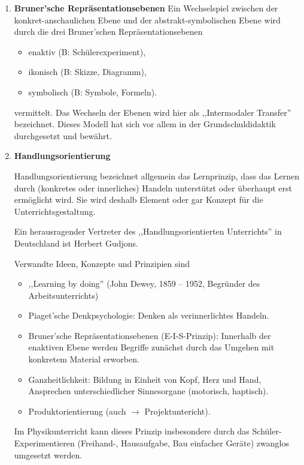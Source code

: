 \begin{enumerate}
\begin{itemize}
	\end{itemize}

	\item{\textbf{Bruner'sche Repr\"{a}sentationsebenen}}
		Ein Wechselspiel zwischen der konkret-anschaulichen Ebene
		und der abstrakt-symbolischen Ebene
		wird durch die drei Bruner'schen Repr\"{a}sentationsebenen
		\begin{itemize}
			\item
			enaktiv (B: Sch\"{u}lerexperiment),
			\item
			ikonisch (B: Skizze, Diagramm),
			\item
			symbolisch (B: Symbole, Formeln).
		\end{itemize}
		vermittelt. Das Wechseln der Ebenen wird hier als
		,,Intermodaler Transfer'' bezeichnet.
		Dieses Modell hat sich vor allem in der Grundschuldidaktik
		durchgesetzt und bew\"{a}hrt.
	
	\item{\textbf{Handlungsorientierung}}
	
	Handlungsorientierung bezeichnet allgemein das Lernprinzip, dass
	das Lernen durch (konkretes oder innerliches)
	Handeln unterst\"{u}tzt oder
	\"{u}berhaupt erst erm\"{o}glicht wird.
	Sie wird deshalb Element oder gar Konzept f\"{u}r die
	Unterrichtsgestaltung.
	
	Ein herausragender Vertreter des
	,,Handlungsorientierten Unterrichts'' in
	Deutschland ist Herbert Gudjons.
		
	Verwandte Ideen, Konzepte und Prinzipien sind
	\begin{itemize}
		\item
		,,Learning by doing'' (John Dewey, 1859 -- 1952,
		                       Begr\"{u}nder des Arbeitsunterrichts)
		\item
		Piaget'sche Denkpsychologie: Denken als verinnerlichtes Handeln.
		\item
		Bruner'sche Repr\"{a}sentationsebenen (E-I-S-Prinzip):
		Innerhalb der enaktiven  Ebene werden Begriffe zun\"{a}chst durch das
		Umgehen mit konkretem Material erworben.
		\item
		Ganzheitlichkeit: Bildung in Einheit von Kopf, Herz und Hand,
		Ansprechen
		unterschiedlicher Sinnesorgane (motorisch, haptisch).
		\item
		Produktorientierung (auch $\to$ Projektuntericht).
	\end{itemize}
	
	Im Physikunterricht kann dieses Prinzip insbesondere durch
	das Sch\"{u}ler-Experimentieren (Freihand-, Hausaufgabe,
	Bau einfacher Ger\"{a}te) zwanglos umgesetzt werden.
	

\end{enumerate}

